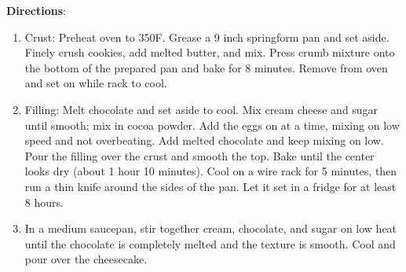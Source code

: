\documentclass[11pt, twoside, openany]{book}
\begin{document}
\begin{minipage}[t]{\linewidth}
\textbf{Directions}:
\vspace{-3mm}\begin{enumerate}\setlength\itemsep{-1mm}
\item Crust: Preheat oven to 350F. Grease a 9 inch springform pan and set aside. Finely crush cookies, add melted butter, and mix. Press crumb mixture onto the bottom of the prepared pan and bake for 8 minutes. Remove from oven and set on while rack to cool.
\item Filling: Melt chocolate and set aside to cool. Mix cream cheese and sugar until smooth; mix in cocoa powder. Add the eggs on at a time, mixing on low speed and not overbeating. Add melted chocolate and keep mixing on low. Pour the filling over the crust and smooth the top. Bake until the center looks dry (about 1 hour 10 minutes). Cool on a wire rack for 5 minutes, then run a thin knife around the sides of the pan. Let it set in a fridge for at least 8 hours.
\item In a medium saucepan, stir together cream, chocolate, and sugar on low heat until the chocolate is completely melted and the texture is smooth. Cool and pour over the cheesecake.
\end{enumerate}
\end{minipage}\vspace{8mm}
\end{document}
